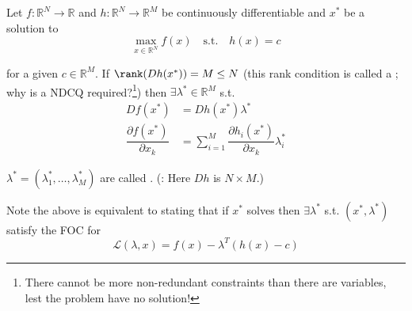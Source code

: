 \documentclass{article}
\begin{document}
\begin{theorem}\label{thm:lecture5_lagrangian}
  Let $f: \mathbb{R}^N \to \mathbb{R}$ and  $h: \mathbb{R}^N \to \mathbb{R}^M$ be  continuously differentiable and $x^*$ be a solution to
  \begin{equation}
    \max_{x \in \mathbb{R}^N} f(x)
    \quad\text{s.t.}\quad
    h(x) = c
    \label{eq:lecture5_max_lagrangian_theorem}
  \end{equation}

  for a given $c \in \mathbb{R}^M$. If $\rank(Dh(x^*)) = M \le N$ (this rank condition is called a ;  why is a NDCQ required?\footnote{There cannot be more non-redundant constraints than there are variables, lest the problem have no solution!}) then $\exists \lambda^* \in \mathbb{R}^M$ s.t.
  \begin{align*}
    Df(x^*)
    & =
    Dh(x^*) \lambda^*
    \\
    \dfrac{\partial f(x^*)}{\partial x_k}
    & =
    \sum^{M}_{i = 1}
    \dfrac{\partial h_i(x^*)}{\partial x_k} \lambda_i^*
  \end{align*}

  $\lambda^* = (\lambda_1^*, \ldots, \lambda_M^*)$ are called . (\NB: Here $Dh$ is $N \times M$.)
\end{theorem}

Note the above is equivalent to stating that if $x^*$ solves  then $\exists \lambda^*$ s.t. $(x^*, \lambda^*)$ satisfy the FOC for
\begin{equation}
  \mathcal{L}(\lambda, x)
  =
  f(x) - \lambda^T (h(x) - c)
\end{equation}
\end{document}
